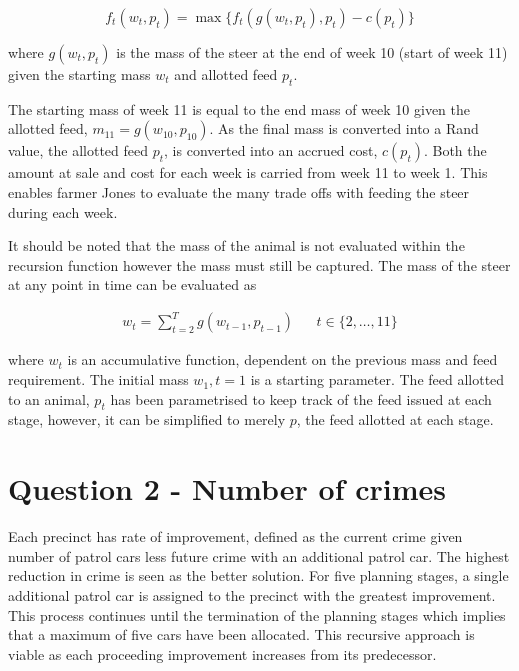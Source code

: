 \documentclass[a4paper,11pt]{article}
\begin{document}
\begin{equation}
	f_t(w_t,p_t) = \max \{f_t(g(w_t,p_t),p_t)- c(p_t)	\}
\end{equation}

where $g(w_t,p_t)$ is the mass of the steer at the end of week 10 (start of week 11) given the starting mass $w_t$ and allotted feed $p_t$. 

The starting mass of week 11 is equal to the end mass of week 10 given the allotted feed, $m_{11} =g (w_{10},p_{10})$. As the final mass is converted into a Rand value, the allotted feed $p_t$, is converted into an accrued cost, $c(p_t)$. Both the amount at sale and cost for each week is carried from week 11 to week 1. This enables farmer Jones to evaluate the many trade offs with feeding the steer during each week.

It should be noted that the mass of the animal is not evaluated within the recursion function however the mass must still be captured. The mass of the steer at any point in time can be evaluated as

\begin{align}
	w_t = \sum_{t=2}^Tg(w_{t-1},p_{t-1}) & &t\in \{2,\dots,11\}
\end{align}

where $w_t$ is an accumulative function, dependent on the previous mass and feed requirement. The initial mass $w_1, t=1$ is a starting parameter. The feed allotted to an animal, $p_t$ has been parametrised to keep track of the feed issued at each stage, however, it can be simplified to merely $p$, the feed allotted at each stage.

\newpage

\section{Question 2 - Number of crimes}

Each precinct has rate of improvement, defined as the current crime given number of patrol cars less future crime with an additional patrol car. The highest reduction in crime is seen as the better solution. For five planning stages, a single additional patrol car is assigned to the precinct with the greatest improvement. This process continues until the termination of the planning stages which implies that a maximum of five cars have been allocated. This recursive approach is viable as each proceeding improvement increases from its
 predecessor.
\end{document}
